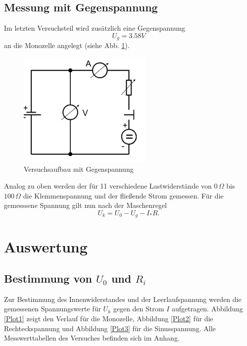 \documentclass[11pt,ngerman,a4paper]{article}
\begin{document}
\subsection{Messung mit Gegenspannung}
Im letzten Versuchsteil wird zus\"atzlich eine Gegenspannung 
\[
U_g = 3.58 V 
\] an die Monozelle angelegt (siehe Abb. \ref{Aufbau2}). 
\begin{figure}[htp]
\centering
\includegraphics[scale=1.00]{abb2.png}
\caption{Versuchsaufbau mit Gegenspannung}
\label{Aufbau2}
\end{figure}Analog zu oben werden der f\"ur 11 verschiedene Lastwiderst\"ande von $0\,\Omega$ bis $100\,\Omega$ die Klemmenspannung und der flie\ss ende Strom gemessen. F\"ur die gemesssene Spannung gilt nun nach der Maschenregel
\begin{equation}
U_k = U_0 - U_g - I_*R.
\end{equation}
\section{Auswertung}


\subsection{Bestimmung von $U_0$ und $R_i$}
Zur Bestimmung des Innenwiderstandes und der Leerlaufspannung werden die gemessenen Spannungswerte f\"ur $U_k$ gegen den Strom $I$ aufgetragen. Abbildung \ref{Plot1} zeigt den Verlauf f\"ur die Monozelle, Abbildung \ref{Plot2} f\"ur die Rechteckspannung und Abbildung \ref{Plot3} f\"ur die Sinusspannung. Alle Messwerttabellen des Versuches befinden sich im Anhang.


 
\end{document}
